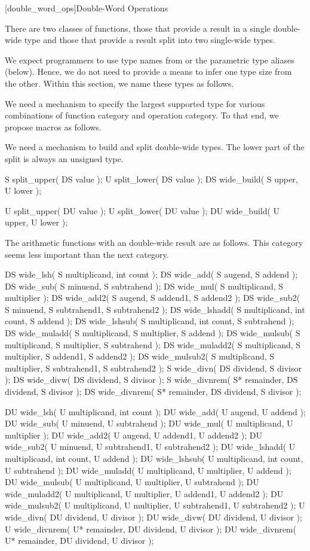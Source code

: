 [double_word_ops]{Double-Word Operations}

There are two classes of functions, those that provide a result in a single double-wide type and those that provide a result split into two single-wide types.

We expect programmers to use type names from  or the parametric type aliases (below). Hence, we do not need to provide a means to infer one type size from the other. Within this section, we name these types as follows.

We need a mechanism to specify the largest supported type for various combinations of function category and operation category. To that end, we propose macros as follows.

We need a mechanism to build and split double-wide types. The lower part of the split is always an unsigned type.

\begin{itemdecl}
S split_upper( DS value );
U split_lower( DS value );
DS wide_build( S upper, U lower );

U split_upper( DU value );
U split_lower( DU value );
DU wide_build( U upper, U lower );	
\end{itemdecl}

The arithmetic functions with an double-wide result are as follows. This category seems less important than the next category.

\begin{itemdecl}
DS wide_lsh( S multiplicand, int count );
DS wide_add( S augend, S addend );
DS wide_sub( S minuend, S subtrahend );
DS wide_mul( S multiplicand, S multiplier );
DS wide_add2( S augend, S addend1, S addend2 );
DS wide_sub2( S minuend, S subtrahend1, S subtrahend2 );
DS wide_lshadd( S multiplicand, int count, S addend );
DS wide_lshsub( S multiplicand, int count, S subtrahend );
DS wide_muladd( S multiplicand, S multiplier, S addend );
DS wide_mulsub( S multiplicand, S multiplier, S subtrahend );
DS wide_muladd2( S multiplicand, S multiplier, S addend1, S addend2 );
DS wide_mulsub2( S multiplicand, S multiplier, S subtrahend1, S subtrahend2 );
S wide_divn( DS dividend, S divisor );
DS wide_divw( DS dividend, S divisor );
S wide_divnrem( S* remainder, DS dividend, S divisor );
DS wide_divnrem( S* remainder, DS dividend, S divisor );

DU wide_lsh( U multiplicand, int count );
DU wide_add( U augend, U addend );
DU wide_sub( U minuend, U subtrahend );
DU wide_mul( U multiplicand, U multiplier );
DU wide_add2( U augend, U addend1, U addend2 );
DU wide_sub2( U minuend, U subtrahend1, U subtrahend2 );
DU wide_lshadd( U multiplicand, int count, U addend );
DU wide_lshsub( U multiplicand, int count, U subtrahend );
DU wide_muladd( U multiplicand, U multiplier, U addend );
DU wide_mulsub( U multiplicand, U multiplier, U subtrahend );
DU wide_muladd2( U multiplicand, U multiplier, U addend1, U addend2 );
DU wide_mulsub2( U multiplicand, U multiplier, U subtrahend1, U subtrahend2 );
U wide_divn( DU dividend, U divisor );
DU wide_divw( DU dividend, U divisor );
U wide_divnrem( U* remainder, DU dividend, U divisor );
DU wide_divnrem( U* remainder, DU dividend, U divisor );		
\end{itemdecl}

